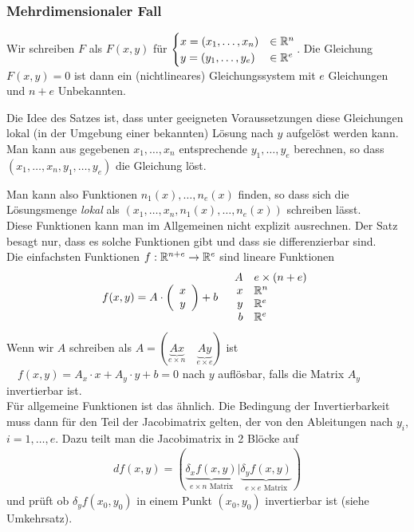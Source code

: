 \documentclass[a4paper]{article}
\begin{document}
	\subsubsection{Mehrdimensionaler Fall}
		\begin{fsatz}
			Wir schreiben $F$ als $F(x,y)$ für $\begin{cases}x=(x_1,\ldots,x_n) & \in \mathbb{R}^n \\ y =(y_1,\ldots, y_e)&\in \mathbb{R}^e\end{cases}$. Die Gleichung $F(x,y) = 0$ ist dann ein (nichtlineares) Gleichungssystem mit $e$ Gleichungen und $n+e$ Unbekannten. 
			
			Die Idee des Satzes ist, dass unter geeigneten Voraussetzungen diese Gleichungen lokal (in der Umgebung einer bekannten) Lösung nach $y$ aufgelöst werden kann. Man kann aus gegebenen $x_1,\ldots,x_n$ entsprechende $y_1,\ldots,y_e$ berechnen, so dass $(x_1,\ldots,x_n,y_1,\ldots,y_e)$ die Gleichung löst. 
			
			Man kann also Funktionen $n_1(x), \ldots, n_e(x)$ finden, so dass sich die Lösungsmenge \emph{lokal} als $(x_1,\ldots,x_n,n_1(x),\ldots,n_e(x))$ schreiben lässt.
			\\
			Diese Funktionen kann man im Allgemeinen nicht explizit ausrechnen. Der Satz besagt nur, dass es solche Funktionen gibt und dass sie differenzierbar sind.\\
			
			Die einfachsten Funktionen $f:\mathbb{R}^{n+e} \rightarrow \mathbb{R}^e$ sind lineare Funktionen 
			\begin{align*}
				f(x,y) &= A \cdot \left( \begin{array}{c} x\\y \end{array} \right) + b&\begin{array}{rl}
				                                 	A&e\times (n+e)\\
				                                 	x&\mathbb{R}^n\\
				                                 	y&\mathbb{R}^e\\
				                                 	b&\mathbb{R}^e
				                                 \end{array}
			\end{align*}
			Wenn wir $A$ schreiben als $A = (\underbrace{Ax}_{e\times n} \quad \underbrace{Ay}_{e\times e})$ ist $\quad f(x,y) = A_x \cdot x + A_y \cdot y + b = 0$	nach $y$ auflösbar, falls die Matrix $A_y$ invertierbar ist. \\
			
			Für allgemeine Funktionen ist das ähnlich. Die Bedingung der Invertierbarkeit muss dann für den Teil der Jacobimatrix gelten, der von den Ableitungen nach $y_i$, $i = 1,\ldots, e$. Dazu teilt man die Jacobimatrix in 2 Blöcke auf
			\begin{align*}
				df(x,y) = (\underbrace{\delta_x f(x,y)}_{e \times n \text{ Matrix}} | \underbrace{\delta_y f(x,y)}_{e \times e \text{ Matrix}})
			\end{align*}
			und prüft ob $\delta_y f(x_0,y_0)$ in einem Punkt $(x_0,y_0)$ invertierbar ist (siehe Umkehrsatz).
		\end{fsatz}
\end{document}
